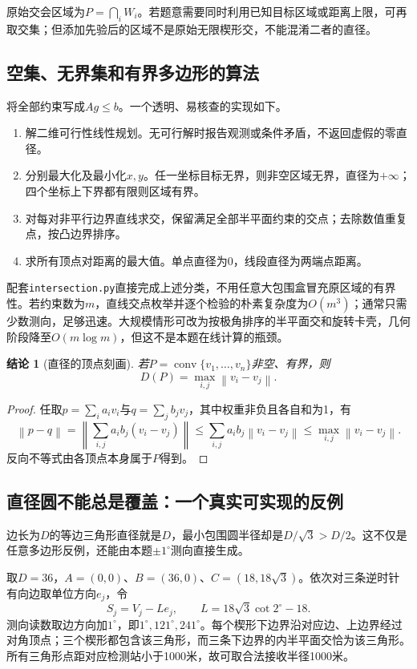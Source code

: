 \documentclass[UTF8,fontset=fandol,a4paper,zihao=-4]{ctexart}
\newtheorem{theorem}{结论}
\DeclareMathOperator{\conv}{conv}
\newcommand{\norm}[1]{\left\lVert#1\right\rVert}
\begin{document}
原始交会区域为$P=\bigcap_i W_i$。若题意需要同时利用已知目标区域或距离上限，可再取交集；但添加先验后的区域不是原始无限楔形交，不能混淆二者的直径。

\subsection{空集、无界集和有界多边形的算法}
将全部约束写成$Ag\le b$。一个透明、易核查的实现如下。
\begin{enumerate}
\item 解二维可行性线性规划。无可行解时报告观测或条件矛盾，不返回虚假的零直径。
\item 分别最大化及最小化$x,y$。任一坐标目标无界，则非空区域无界，直径为$+\infty$；四个坐标上下界都有限则区域有界。
\item 对每对非平行边界直线求交，保留满足全部半平面约束的交点；去除数值重复点，按凸边界排序。
\item 求所有顶点对距离的最大值。单点直径为0，线段直径为两端点距离。
\end{enumerate}

配套\texttt{intersection.py}直接完成上述分类，不用任意大包围盒冒充原区域的有界性。若约束数为$m$，直线交点枚举并逐个检验的朴素复杂度为$O(m^3)$；通常只需少数测向，足够迅速。大规模情形可改为按极角排序的半平面交和旋转卡壳，几何阶段降至$O(m\log m)$，但这不是本题在线计算的瓶颈。

\begin{theorem}[直径的顶点刻画]\label{thm:diameter}
若$P=\conv\{v_1,\ldots,v_n\}$非空、有界，则
\begin{equation}D(P)=\max_{i,j}\norm{v_i-v_j}.\end{equation}
\end{theorem}
\begin{proof}
任取$p=\sum_i a_iv_i$与$q=\sum_j b_jv_j$，其中权重非负且各自和为1，有
\[
\norm{p-q}=\norm{\sum_{i,j}a_ib_j(v_i-v_j)}
\le\sum_{i,j}a_ib_j\norm{v_i-v_j}\le\max_{i,j}\norm{v_i-v_j}.
\]
反向不等式由各顶点本身属于$P$得到。
\end{proof}

\subsection{直径圆不能总是覆盖：一个真实可实现的反例}
边长为$D$的等边三角形直径就是$D$，最小包围圆半径却是$D/\sqrt3>D/2$。这不仅是任意多边形反例，还能由本题$\pm1^\circ$测向直接生成。

取$D=36$，$A=(0,0)$、$B=(36,0)$、$C=(18,18\sqrt3)$。依次对三条逆时针有向边取单位方向$e_j$，令
\begin{equation}
S_j=V_j-Le_j,\qquad L=18\sqrt3\cot2^\circ-18.
\end{equation}
测向读数取边方向加$1^\circ$，即$1^\circ,121^\circ,241^\circ$。每个楔形下边界沿对应边、上边界经过对角顶点；三个楔形都包含该三角形，而三条下边界的内半平面交恰为该三角形。所有三角形点距对应检测站小于1000米，故可取合法接收半径1000米。
\end{document}
